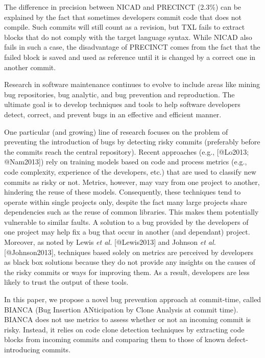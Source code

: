 The difference in precision between NICAD and PRECINCT (2.3\%) can be
explained by the fact that sometimes developers commit code that does
not compile. Such commits will still count as a revision, but TXL fails
to extract blocks that do not comply with the target language syntax.
While NICAD also fails in such a case, the disadvantage of PRECINCT
comes from the fact that the failed block is saved and used as reference
until it is changed by a correct one in another commit.

Research in software maintenance continues to evolve to include areas
like mining bug repositories, bug analytic, and bug prevention and
reproduction. The ultimate goal is to develop techniques and tools to
help software developers detect, correct, and prevent bugs in an
effective and efficient manner.

One particular (and growing) line of research focuses on the problem of
preventing the introduction of bugs by detecting risky commits
(preferably before the commits reach the central repository). Recent
approaches (e.g., {[}@Lo2013; @Nam2013{]}) rely on training models based
on code and process metrics (e.g., code complexity, experience of the
developers, etc.) that are used to classify new commits as risky or not.
Metrics, however, may vary from one project to another, hindering the
reuse of these models. Consequently, these techniques tend to operate
within single projects only, despite the fact many large projects share
dependencies such as the reuse of common libraries. This makes them
potentially vulnerable to similar faults. A solution to a bug provided
by the developers of one project may help fix a bug that occur in
another (and dependant) project. Moreover, as noted by Lewis \emph{et
al.} {[}@Lewis2013{]} and Johnson \emph{et al.} {[}@Johnson2013{]},
techniques based solely on metrics are perceived by developers as black
box solutions because they do not provide any insights on the causes of
the risky commits or ways for improving them. As a result, developers
are less likely to trust the output of these tools.

In this paper, we propose a novel bug prevention approach at
commit-time, called BIANCA (Bug Insertion ANticipation by Clone Analysis
at commit time). BIANCA does not use metrics to assess whether or not an
incoming commit is risky. Instead, it relies on code clone detection
techniques by extracting code blocks from incoming commits and comparing
them to those of known defect-introducing commits.

